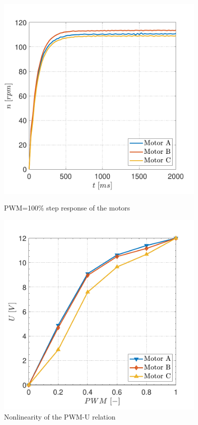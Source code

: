 \documentclass[12pt,english,twoside]{article}
\begin{document}
\begin{figure}[htb!]
	\centering
	\centering
	\includegraphics[width=0.9\textwidth]{figures/directed_speed_pwm_100}
	\caption{PWM=100\% step response of the motors}
	\label{directed_speed_pwm_100}
	\endminipage\hfill
	\centering
	\includegraphics[width=0.9\textwidth]{figures/pwm_u}
	\caption{Nonlinearity of the PWM-U relation}
	\label{pwm_characteristic}
	\endminipage\hfill
\end{figure}
\end{document}

